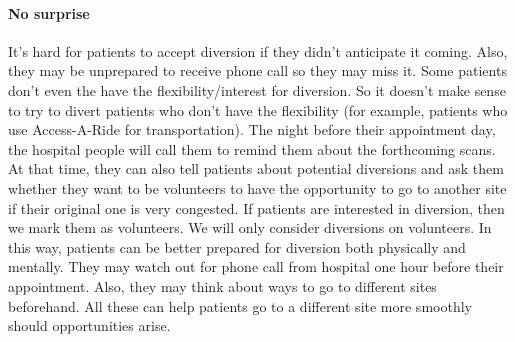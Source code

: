 \paragraph{No surprise} It's hard for patients to accept diversion if they didn't anticipate it coming. Also, they may be unprepared to receive phone call so they may miss it. Some patients don't even the have the flexibility/interest for diversion. So it doesn't make sense to try to divert patients who don't have the flexibility (for example, patients who use Access-A-Ride for transportation). The night before their appointment day, the hospital people will call them to remind them about the forthcoming scans. At that time, they can also tell patients about potential diversions and ask them whether they want to be volunteers to have the opportunity to go to another site if their original one is very congested. If patients are interested in diversion, then we mark them as volunteers. We will only consider diversions on volunteers. In this way, patients can be better prepared for diversion both physically and mentally. They may watch out for phone call from hospital one hour before their appointment. Also, they may think about ways to go to different sites beforehand. All these can help patients go to a different site more smoothly should opportunities arise.
